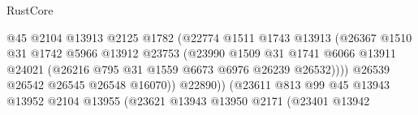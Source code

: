 \begin{lexlean}{RustCore}
\begin{coremodule}
                                            @45
                                            @2104
                                            @13913
                                            @2125
                                            @1782
                                            (@22774
                                              @1511
                                              @1743
                                              @13913
                                              (@26367
                                                @1510
                                                @31
                                                @1742
                                                @5966
                                                @13912
                                                @23753
                                                (@23990
                                                  @1509
                                                  @31
                                                  @1741
                                                  @6066
                                                  @13911
                                                  @24021
                                                  (@26216
                                                    @795
                                                    @31
                                                    @1559
                                                    @6673
                                                    @6976
                                                    @26239
                                                    @26532))))
                                            @26539
                                            @26542
                                            @26545
                                            @26548
                                            @16070))
                                        @22890))
                                    (@23611
                                      @813
                                      @99
                                      @45
                                      @13943
                                      @13952
                                      @2104
                                      @13955
                                      (@23621
                                        @13943
                                        @13950
                                        @2171
                                        (@23401
                                          @13942

\end{coremodule}
\end{lexlean}
